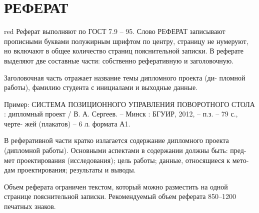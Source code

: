\section*{РЕФЕРАТ}
\thispagestyle{empty}

\begin{color}{red}
  Реферат выполняют по ГОСТ 7.9 -- 95. Слово РЕФЕРАТ записывают
  прописными буквами полужирным шрифтом по центру, страницу не нумеруют,
  но включают в общее количество страниц пояснительной записки.
  В реферате выделяют две составные части: собственно реферативную и
  заголовочную.

  Заголовочная часть отражает название темы дипломного проекта (ди-
  пломной работы), фамилию студента с инициалами и выходные данные.

  Пример:
  СИСТЕМА ПОЗИЦИОННОГО УПРАВЛЕНИЯ ПОВОРОТНОГО СТОЛА :
  дипломный проект / В. А. Сергеев. – Минск : БГУИР, 2012, – п.з. – 79 с., черте-
  жей (плакатов) – 6 л. формата А1.

  В реферативной части кратко излагается содержание дипломного проекта
  (дипломной работы). Основными аспектами в содержании должны быть: пред-
  мет проектирования (исследования); цель работы; данные, относящиеся к мето-
  дам проектирования; результаты и выводы.

  Объем реферата ограничен текстом, который можно разместить на одной
  странице пояснительной записки. Рекомендуемый объем реферата 850–1200
  печатных знаков.
\end{color}

\pagebreak
